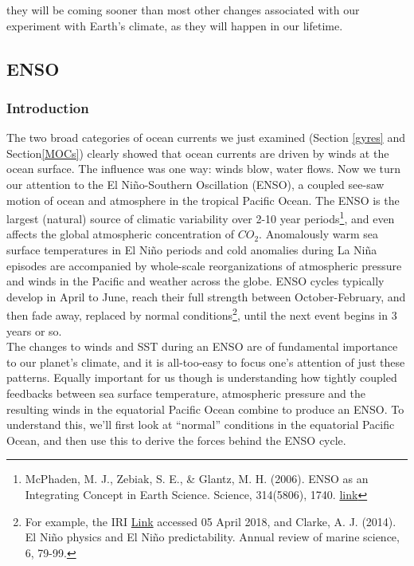 \documentclass[amstex,12pt]{book}
\begin{document}
{they will be coming sooner than most other changes associated with our experiment with Earth's climate, as they will happen in our lifetime. 
\subsection{ENSO}\label{ENSO}
\subsubsection{Introduction}
The two broad categories of ocean currents we just examined (Section \ref{gyres} and Section\ref{MOCs}) clearly showed that ocean currents are driven by winds at the ocean surface. The influence was one way: winds blow, water flows. Now we turn our attention to the El Ni\~no-Southern Oscillation (ENSO), a coupled see-saw motion of ocean and atmosphere in the tropical Pacific Ocean. The ENSO is the largest (natural) source of climatic variability over 2-10 year periods\footnote{McPhaden, M. J., Zebiak, S. E., \& Glantz, M. H. (2006). ENSO as an Integrating Concept in Earth Science. Science, 314(5806), 1740. \href{https://doi.org/10.1126/science.1132588}{link}}, and even affects the global atmospheric concentration of $CO_2$. Anomalously warm sea surface temperatures in El Ni\~no periods and cold anomalies during La Ni\~na episodes are accompanied by whole-scale reorganizations of atmospheric pressure and winds in the Pacific and weather across the globe. ENSO cycles typically develop in April to June, reach their full strength between October-February, and then fade away, replaced by normal conditions\footnote{For example, the IRI \href{http://iri.columbia.edu/our-expertise/climate/forecasts/enso/current/}{Link} accessed 05 April 2018, and Clarke, A. J. (2014). El Ni\~no physics and El Ni\~no predictability. Annual review of marine science, 6, 79-99.}, until the next event begins in 3 years or so.\\
The changes to winds and SST during an ENSO are of fundamental importance to  our planet's climate, and it is all-too-easy to focus one's attention of just these patterns. Equally important for us though is understanding how tightly coupled feedbacks between sea surface temperature, atmospheric pressure and the resulting winds in the equatorial Pacific Ocean combine to produce an ENSO. To understand this, we'll first look at ``normal'' conditions in the equatorial Pacific Ocean, and then use this to derive the forces behind the ENSO cycle.

}
\end{document}
